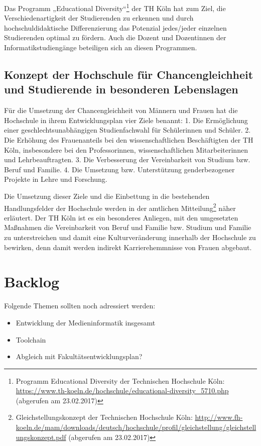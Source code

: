 Das Programm „Educational Diversity``\footnote{Programm Educational
  Diversity der Technischen Hochschule Köln:
  \url{https://www.th-koeln.de/hochschule/educational-diversity_5710.php}
  (abgerufen am 23.02.2017)} der TH Köln hat zum Ziel, die
Verschiedenartigkeit der Studierenden zu erkennen und durch
hochschuldidaktische Differenzierung das Potenzial jedes/jeder einzelnen
Studierenden optimal zu fördern. Auch die Dozent und Dozentinnen der
Informatikstudiengänge beteiligen sich an diesen Programmen.

\section{Konzept der Hochschule für Chancengleichheit und Studierende
in besonderen
Lebenslagen}\label{konzept-der-hochschule-fuxfcr-chancengleichheit-und-studierende-in-besonderen-lebenslagen}

Für die Umsetzung der Chancengleichheit von Männern und Frauen hat die
Hochschule in ihrem Entwicklungsplan vier Ziele benannt: 1. Die
Ermöglichung einer geschlechtsunabhängigen Studienfachwahl für
Schülerinnen und Schüler. 2. Die Erhöhung des Frauenanteils bei den
wissenschaftlichen Beschäftigten der TH Köln, insbesondere bei den
Professorinnen, wissenschaftlichen Mitarbeiterinnen und
Lehrbeauftragten. 3. Die Verbesserung der Vereinbarkeit von Studium bzw.
Beruf und Familie. 4. Die Umsetzung bzw. Unterstützung genderbezogener
Projekte in Lehre und Forschung.

Die Umsetzung dieser Ziele und die Einbettung in die bestehenden
Handlungsfelder der Hochschule werden in der amtlichen
Mitteilung\footnote{Gleichstellungskonzept der Technischen Hochschule
  Köln:
  \url{http://www.fh-koeln.de/mam/downloads/deutsch/hochschule/profil/gleichstellung/gleichstellungskonzept.pdf}
  (abgerufen am 23.02.2017)} näher erläutert. Der TH Köln ist es ein
besonderes Anliegen, mit den umgesetzten Maßnahmen die Vereinbarkeit von
Beruf und Familie bzw. Studium und Familie zu unterstreichen und damit
eine Kulturveränderung innerhalb der Hochschule zu bewirken, denn damit
werden indirekt Karrierehemmnisse von Frauen abgebaut.

\chapter{Backlog}\label{backlog}

Folgende Themen sollten noch adressiert werden:

\begin{itemize}
\tightlist
\item
  Entwicklung der Medieninformatik insgesamt
\item
  Toolchain
\item
  Abgleich mit Fakultätsentwicklungsplan?
\end{itemize}

